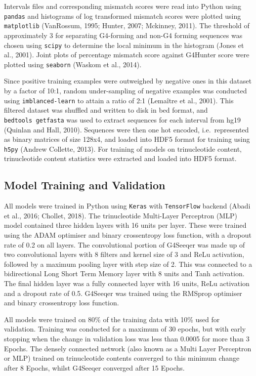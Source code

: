 \documentclass[12pt,a4paper,]{report}
\begin{document}
Intervals files and corresponding mismatch scores were read into Python
using \texttt{pandas} and histograms of log transformed mismatch scores
were plotted using \texttt{matplotlib} (VanRossum, 1995; Hunter, 2007;
Mckinney, 2011). The threshold of approximately 3 for separating
G4-forming and non-G4 forming sequences was chosen using \texttt{scipy}
to determine the local minimum in the histogram (Jones et al., 2001).
Joint plots of percentage mismatch score against G4Hunter score were
plotted using \texttt{seaborn} (Waskom et al., 2014).

Since positive training examples were outweighed by negative ones in
this dataset by a factor of 10:1, random under-sampling of negative
examples was conducted using \texttt{imblanced-learn} to attain a ratio
of 2:1 (Lemaître et al., 2001). This filtered dataset was shuffled and
written to disk in bed format, and \texttt{bedtools\ getfasta} was used
to extract sequences for each interval from hg19 (Quinlan and Hall,
2010). Sequences were then one hot encoded, i.e.~represented as binary
matrices of size 128x4, and loaded into HDF5 format for training using
\texttt{h5py} (Andrew Collette, 2013). For training of models on
trinucleotide content, trinucleotide content statistics were extracted
and loaded into HDF5 format.

\hypertarget{model-training-and-validation}{%
\subsection{Model Training and
Validation}\label{model-training-and-validation}}

All models were trained in Python using \texttt{Keras} with
\texttt{TensorFlow} backend (Abadi et al., 2016; Chollet, 2018). The
trinucleotide Multi-Layer Perceptron (MLP) model contained three hidden
layers with 16 units per layer. These were trained using the ADAM
optimiser and binary crossentropy loss function, with a dropout rate of
0.2 on all layers. The convolutional portion of G4Seeqer was made up of
two convolutional layers with 8 filters and kernel size of 3 and ReLu
activation, followed by a maximum pooling layer with step size of 2.
This was connected to a bidirectional Long Short Term Memory layer with
8 units and Tanh activation. The final hidden layer was a fully
connected layer with 16 units, ReLu activation and a dropout rate of
0.5. G4Seeqer was trained using the RMSprop optimiser and binary
crossentropy loss function.

All models were trained on 80\% of the training data with 10\% used for
validation. Training was conducted for a maximum of 30 epochs, but with
early stopping when the change in validation loss was less than 0.0005
for more than 3 Epochs. The densely connected network (also known as a
Multi Layer Perceptron or MLP) trained on trinucleotide contents
converged to this minimum change after 8 Epochs, whilst G4Seeqer
converged after 15 Epochs.
\end{document}
